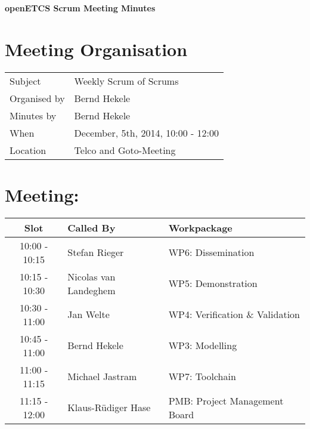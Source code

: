 \documentclass[a4paper, 11pt]{article}
\begin{document}
{\begin{center}\huge\bf openETCS Scrum Meeting Minutes\end{center}}
\section{Meeting Organisation}

\renewcommand{\arraystretch}{1.5}
\begin{supertabular}{m{.2\textwidth}m{.8\textwidth}}
Subject & Weekly Scrum of Scrums\\
Organised by &Bernd Hekele\\
Minutes by & Bernd Hekele\\
When & December, 5th, 2014, 10:00 - 12:00\\
Location & Telco and Goto-Meeting\\
\end{supertabular}

\renewcommand{\arraystretch}{1.0}
\section{Meeting:}

\begin{tabular}{|c|l|l|}
\hline
\textbf{Slot} &  \textbf{Called By} & \textbf{Workpackage} \\
\hline  
10:00 - 10:15 & Stefan Rieger & WP6: Dissemination \\\hline  
10:15 - 10:30 & Nicolas van Landeghem & WP5: Demonstration \\\hline  
10:30 - 11:00 & Jan Welte & WP4: Verification \& Validation \\\hline  
10:45 - 11:00 & Bernd Hekele & WP3: Modelling \\\hline  
11:00 - 11:15 & Michael Jastram & WP7: Toolchain \\\hline
11:15 - 12:00 & Klaus-R\"udiger Hase & PMB: Project Management Board \\\hline  
\end{tabular}
\end{document}
